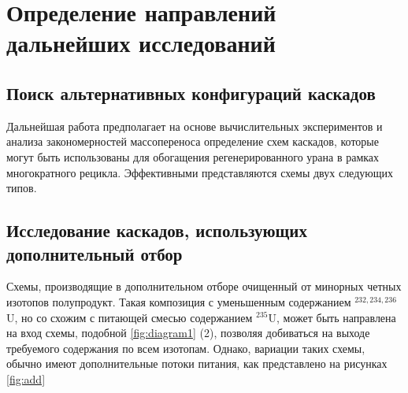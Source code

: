 \section{Определение направлений дальнейших исследований}

\subsection{Поиск альтернативных конфигураций каскадов}
Дальнейшая работа предполагает на основе вычислительных экспериментов и анализа закономерностей массопереноса определение схем каскадов, которые могут быть использованы для обогащения регенерированного урана в рамках многократного рецикла. Эффективными представляются схемы двух следующих типов.

\subsection{Исследование каскадов, использующих дополнительный отбор}
Схемы, производящие в дополнительном отборе очищенный от минорных четных изотопов полупродукт. Такая композиция с уменьшенным содержанием $^{232,234,236}$U, но со схожим с питающей смесью содержанием $^{235}$U, может быть направлена на вход схемы, подобной \ref{fig:diagram1} (2), позволяя добиваться на выходе требуемого содержания по всем изотопам. Однако, вариации таких схемы, обычно имеют дополнительные потоки питания, как представлено на рисунках \ref{fig:add}

